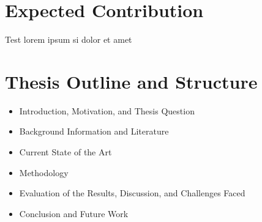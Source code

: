 \documentclass[english]{lni}
\begin{document}
\section{Expected Contribution}
Test lorem ipsum si dolor et amet \cite{ettinger2025enterprise}

\section{Thesis Outline and Structure}
\begin{itemize}
    \item Introduction, Motivation, and Thesis Question
    \item Background Information and Literature
    \item Current State of the Art
    \item Methodology
    \item Evaluation of the Results, Discussion, and Challenges Faced
    \item Conclusion and Future Work
\end{itemize}




\printbibliography
\end{document}

